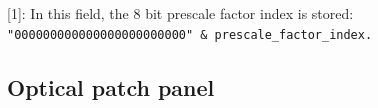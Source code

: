 [1]: In this field, the 8 bit prescale factor index is stored:\\
\texttt{\small{"000000000000000000000000" \& prescale\_factor\_index.}}\\

\clearpage

\subsection{Optical patch panel}\label{sec:app:app_d}

% 
